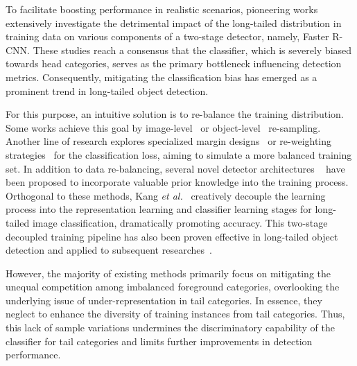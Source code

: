\documentclass[lettersize,journal]{IEEEtran}
\begin{document}
To facilitate boosting performance in realistic scenarios, pioneering works~\cite{wang2020devil, li2020overcoming} extensively investigate the detrimental impact of  the long-tailed distribution in training data on various components of a two-stage detector, namely, Faster R-CNN.
These studies reach a consensus that the classifier, which is severely biased towards head categories, serves as the primary bottleneck influencing detection metrics.
Consequently, mitigating the classification bias has emerged as a prominent trend in long-tailed object detection.

For this purpose, an intuitive solution is to re-balance the training distribution.
Some works achieve this goal by image-level~\cite{gupta2019lvis} or object-level~\cite{chang2021image, feng2021exploring} re-sampling.
Another line of research explores specialized margin designs~\cite{cao2019learning, ren2020balanced, feng2021exploring} or re-weighting strategies~\cite{tan2020equalization, wang2021adaptive, tan2021equalization, zhang2021distribution, wang2021seesaw} for the classification loss, aiming to simulate a more balanced training set.
In addition to data re-balancing, several novel detector architectures ~\cite{li2020overcoming,wu2020forest} have been proposed to incorporate valuable prior knowledge into the training process.
Orthogonal to these methods, Kang {\em et al.}~\cite{kang2019decoupling} creatively decouple the learning process into the representation learning and classifier learning stages for long-tailed image classification, dramatically promoting accuracy.
This two-stage decoupled training pipeline has also been proven effective in long-tailed object detection and applied to subsequent researches~\cite{li2020overcoming, wang2021adaptive, feng2021exploring}.

However, the majority of existing methods primarily focus on mitigating the unequal competition among imbalanced foreground categories, overlooking the underlying issue of under-representation in tail categories.	
In essence, they neglect to enhance the diversity of training instances from tail categories.
Thus, this lack of sample variations undermines the discriminatory capability of the classifier for tail categories and limits further improvements in detection performance.
\end{document}
